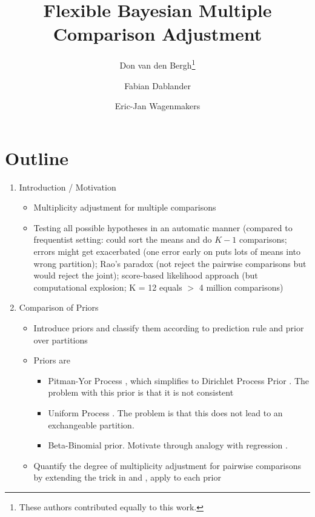 \documentclass[11pt,a4paper]{article}
\date{}
\title{Flexible Bayesian Multiple Comparison Adjustment}
\author[1]{Don van den Bergh\thanks{These authors contributed equally to this work.}}
\author[1]{Fabian Dablander\samethanks[1]}
\author[1]{Eric-Jan Wagenmakers}
\affil[1]{Department of Psychological Methods, University of Amsterdam}
\theoremstyle{definition} %
\theoremstyle{case}
\begin{document}
\maketitle

\section*{Outline}
\begin{enumerate}
    \item Introduction / Motivation
    \begin{itemize}
        \item Multiplicity adjustment for multiple comparisons
        \item Testing all possible hypotheses in an automatic manner (compared to frequentist setting: could sort the means and do $K - 1$ comparisons; errors might get exacerbated (one error early on puts lots of means into wrong partition); Rao's paradox (not reject the pairwise comparisons but would reject the joint); score-based likelihood approach (but computational explosion; K = 12 equals $>$ 4 million comparisons)
    \end{itemize}
    \item Comparison of Priors
    \begin{itemize}
        \item Introduce priors and classify them according to prediction rule and prior over partitions
        \item Priors are
        \begin{itemize}
            \item Pitman-Yor Process \parencite{ishwaran2001bayesian, pitman1996some}, which simplifies to Dirichlet Process Prior \parencite{gopalan1998bayesian}. The problem with this prior is that it is not consistent \parencite{miller2013simple, miller2018mixture}
            \item Uniform Process \parencite{wallach2010alternative}. The problem is that this does not lead to an exchangeable partition.
            \item Beta-Binomial prior. Motivate through analogy with regression \parencite{scott2006exploration, scott2010bayes}.
        \end{itemize}
        \item Quantify the degree of multiplicity adjustment for pairwise comparisons by extending the trick in \textcite{scott2010bayes} and \textcite{li2016role}, apply to each prior
        \begin{itemize}

\end{itemize}
\end{itemize}
\end{enumerate}
\end{document}
